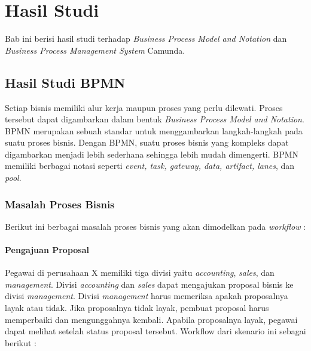 \chapter{Hasil Studi}
\label{chap:hasilstudi}
Bab ini berisi hasil studi terhadap \textit{Business Process Model and Notation} dan \textit{Business Process Management System} Camunda. 

\section{Hasil Studi BPMN}
\label{sec:hasilstudi_bpmn}
Setiap bisnis memiliki alur kerja maupun proses yang perlu dilewati. Proses tersebut dapat digambarkan dalam bentuk \textit{Business Process Model and Notation}. BPMN merupakan sebuah standar untuk menggambarkan langkah-langkah pada suatu proses bisnis. Dengan BPMN, suatu proses bisnis yang kompleks dapat digambarkan menjadi lebih sederhana sehingga lebih mudah dimengerti. BPMN memiliki berbagai notasi seperti \textit{event, task, gateway, data, artifact, lanes}, dan \textit{pool}.  

	
\subsection{Masalah Proses Bisnis}
\label{hasilstudi_bpmn_masalah}
Berikut ini berbagai masalah proses bisnis yang akan dimodelkan pada \textit{workflow} :

\subsubsection{Pengajuan Proposal}
Pegawai di perusahaan X memiliki tiga divisi yaitu \textit{accounting}, \textit{sales}, dan \textit{management}. Divisi \textit{accounting} dan \textit{sales} dapat mengajukan proposal bisnis ke divisi \textit{management}. Divisi \textit{management} harus memeriksa apakah proposalnya layak atau tidak. Jika proposalnya tidak layak, pembuat proposal harus memperbaiki dan mengunggahnya kembali. Apabila proposalnya layak, pegawai dapat melihat setelah status proposal tersebut. Workflow dari skenario ini sebagai berikut :


